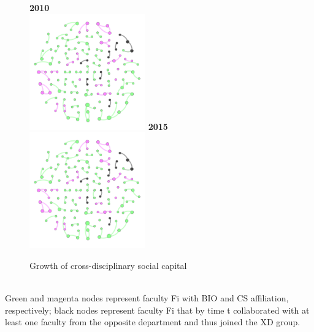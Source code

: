 \documentclass[10pt]{article}         %
\begin{document}
\begin{figure}[!htb]
\endminipage\hfill
{}
  \textbf{2010}\\
  \includegraphics[width=5cm, height=5cm]{S42010.png}
\endminipage\hfill
{}%
  \textbf{2015}\\
  \includegraphics[width=5cm, height=5cm]{S42015.png}
\endminipage
\caption{Growth of cross-disciplinary social capital}\label{fig:s3}
\end{figure}\\
Green and magenta nodes represent faculty Fi with BIO and CS affiliation, respectively; black nodes represent faculty Fi that by time t collaborated with at least one faculty from the opposite department and thus joined the XD group.


\bigskip   %
\end{document}
